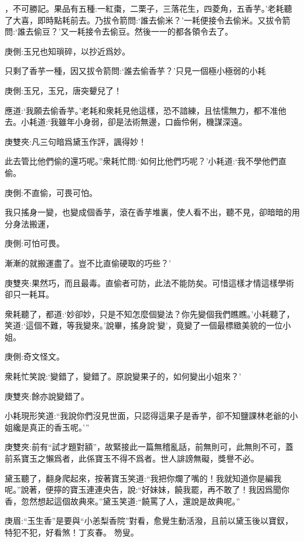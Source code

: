 \begin{parag}
，不可勝記。果品有五種:一紅棗，二栗子，三落花生，四菱角，五香芋。’老耗聽了大喜，即時點耗前去。乃拔令箭問:‘誰去偷米？’一耗便接令去偷米。又拔令箭問:‘誰去偷豆？’又一耗接令去偷豆。然後一一的都各領令去了。\begin{note}庚側:玉兄也知瑣碎，以抄近爲妙。\end{note}只剩了香芋一種，因又拔令箭問:‘誰去偷香芋？’只見一個極小極弱的小耗\begin{note}庚側:玉兄，玉兄，唐突顰兒了！\end{note}應道:‘我願去偷香芋。’老耗和衆耗見他這樣，恐不諳練，且怯懦無力，都不准他去。小耗道:‘我雖年小身弱，卻是法術無邊，口齒伶俐，機謀深遠。\begin{note}庚雙夾:凡三句暗爲黛玉作評，諷得妙！\end{note}此去管比他們偷的還巧呢。”衆耗忙問:‘如何比他們巧呢？’小耗道:‘我不學他們直偷。\begin{note}庚側:不直偷，可畏可怕。\end{note}我只搖身一變，也變成個香芋，滾在香芋堆裏，使人看不出，聽不見，卻暗暗的用分身法搬運，\begin{note}庚側:可怕可畏。\end{note}漸漸的就搬運盡了。豈不比直偷硬取的巧些？’\begin{note}庚雙夾:果然巧，而且最毒。直偷者可防，此法不能防矣。可惜這樣才情這樣學術卻只一耗耳。\end{note}衆耗聽了，都道:‘妙卻妙，只是不知怎麼個變法？你先變個我們瞧瞧。’小耗聽了，笑道:‘這個不難，等我變來。’說畢，搖身說‘變’，竟變了一個最標緻美貌的一位小姐。\begin{note}庚側:奇文怪文。\end{note}衆耗忙笑說:‘變錯了，變錯了。原說變果子的，如何變出小姐來？’\begin{note}庚雙夾:餘亦說變錯了。\end{note}小耗現形笑道:“我說你們沒見世面，只認得這果子是香芋，卻不知鹽課林老爺的小姐纔是真正的香玉呢。’”\begin{note}庚雙夾:前有“試才題對額”，故緊接此一篇無稽亂話，前無則可，此無則不可，蓋前系寶玉之懶爲者，此係寶玉不得不爲者。世人誹謗無礙，獎譽不必。\end{note}
\end{parag}


\begin{parag}
    黛玉聽了，翻身爬起來，按著寶玉笑道:“我把你爛了嘴的！我就知道你是編我呢。”說著，便擰的寶玉連連央告，說:“好妹妹，饒我罷，再不敢了！我因爲聞你香，忽然想起這個故典來。”黛玉笑道:“饒罵了人，還說是故典呢。”\begin{note}庚眉:“玉生香”是要與“小恙梨香院”對看，愈覺生動活潑，且前以黛玉後以寶釵，特犯不犯，好看煞！丁亥春。 笏叟。\end{note}
\end{parag}


